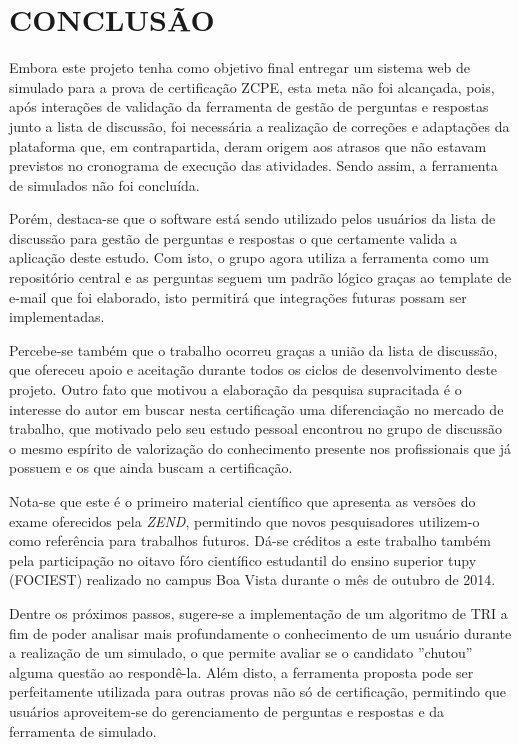 \chapter{CONCLUSÃO}
\label{chp:conclusao}

Embora este projeto tenha como objetivo final entregar um sistema web de simulado
para a prova de certificação \acs{ZCPE}, esta meta não foi alcançada, pois, 
após interações de validação da ferramenta de gestão de perguntas e
respostas junto a lista de discussão, foi necessária a realização de correções e
adaptações da plataforma que, em contrapartida, deram origem aos atrasos que não
estavam previstos no cronograma de execução das atividades. Sendo assim, a
ferramenta de simulados não foi concluída.

Porém, destaca-se que o software está sendo utilizado pelos usuários da lista
de discussão para gestão de perguntas e respostas o que certamente valida a
aplicação deste estudo. Com isto, o grupo agora utiliza a ferramenta como um
repositório central e as perguntas seguem um padrão lógico graças ao template de
e-mail que foi elaborado, isto permitirá que integrações futuras possam ser
implementadas.

Percebe-se também que o trabalho ocorreu graças a união da lista de discussão,
que ofereceu apoio e aceitação durante todos os ciclos de desenvolvimento deste
projeto. Outro fato que motivou a elaboração da pesquisa supracitada é o
interesse do autor em buscar nesta certificação uma diferenciação no mercado de trabalho,
que motivado pelo seu estudo pessoal encontrou no grupo de discussão o mesmo
espírito de valorização do conhecimento presente nos profissionais que já
possuem e os que ainda buscam a certificação.

Nota-se que este é o primeiro material científico que apresenta as versões do
exame oferecidos pela \textit{ZEND}, permitindo que novos pesquisadores 
utilizem-o como referência para trabalhos futuros. Dá-se créditos a este
trabalho também pela participação no oitavo fóro científico estudantil do ensino
superior tupy (FOCIEST) realizado no campus Boa Vista durante o mês de outubro 
de 2014.

Dentre os próximos passos, sugere-se a implementação de um algoritmo de \ac{TRI}
a fim de poder analisar mais profundamente o conhecimento de um usuário durante a
realização de um simulado, o que permite avaliar se o candidato ''chutou''
alguma questão ao respondê-la. Além disto, a ferramenta proposta pode ser
perfeitamente utilizada para outras provas não só de certificação, permitindo
que usuários aproveitem-se do gerenciamento de perguntas e respostas e da 
ferramenta de simulado.